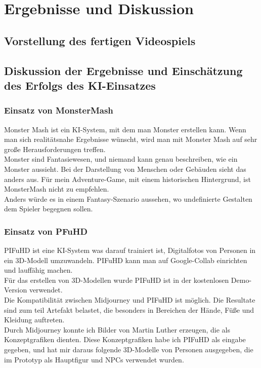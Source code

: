 \documentclass[12pt,a4paper,bibliography=totocnumbered,listof=totocnumbered]{scrartcl}
\begin{document}
\section{Ergebnisse und Diskussion}
\subsection{Vorstellung des fertigen Videospiels}
\subsection{Diskussion der Ergebnisse und Einschätzung des Erfolgs des KI-Einsatzes}
\subsubsection{Einsatz von MonsterMash}
Monster Mash ist ein KI-System, mit dem man Monster erstellen kann. Wenn man sich realitätsnahe Ergebnisse wünscht, wird man mit Monster Mash auf sehr große Herausforderungen treffen.
\\
Monster sind Fantasiewesen, und niemand kann genau beschreiben, wie ein Monster aussieht. Bei der Darstellung von Menschen oder Gebäuden sieht das anders aus. Für mein Adventure-Game, mit einem historischen Hintergrund, ist MonsterMash nicht zu empfehlen.
\\
Anders würde es in einem Fantasy-Szenario aussehen, wo undefinierte Gestalten dem Spieler begegnen sollen.

\subsubsection{Einsatz von PFuHD}
PIFuHD ist eine KI-System was darauf trainiert ist, Digitalfotos von Personen in ein 3D-Modell umzuwandeln. PIFuHD kann man auf Google-Collab einrichten und lauffähig machen.
\\
 Für das erstellen von 3D-Modellen wurde PIFuHD ist in der kostenlosen Demo-Version verwendet.
\\
Die Kompatibilität zwischen Midjourney und PIFuHD ist möglich. Die Resultate sind zum teil Artefakt belastet, die besonders in Bereichen der Hände, Füße und Kleidung auftreten.
\\
Durch Midjourney konnte ich Bilder von Martin Luther erzeugen, die als Konzeptgrafiken dienten. Diese Konzeptgrafiken habe ich PIFuHD als eingabe gegeben, und hat mir daraus folgende 3D-Modelle von Personen ausgegeben, die im Prototyp als  Hauptfigur und NPCs verwendet wurden.
\end{document}
